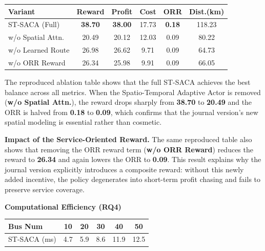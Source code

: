 \documentclass[11pt, a4paper]{article}
\begin{document}
\begin{itemize}
\begin{boxedminipage}[htbp]{\linewidth}
    \begin{center}
    \captionsetup{font=normalsize}
    \normalsize
    \setlength{\tabcolsep}{2pt}
    \begin{tabular}{@{}lccccc@{}}
    \toprule
    Variant & Reward & Profit & Cost & ORR & Dist.(km) \\
    \midrule
    ST-SACA (Full) & \textbf{38.70} & \textbf{38.00} & 17.73 & \textbf{0.18} & 118.23 \\
    w/o Spatial Attn. & 20.49 & 20.12 & 12.03 & 0.09 & 80.22 \\
    w/o Learned Route & 26.98 & 26.62 & 9.71 & 0.09 & 64.73 \\
    w/o ORR Reward & 26.34 & 25.98 & 9.91 & 0.09 & 66.05 \\
    \bottomrule
    \end{tabular}
    \end{center}

    The reproduced ablation table shows that the full ST-SACA achieves the best balance across all metrics. When the Spatio-Temporal Adaptive Actor is removed (\textbf{w/o Spatial Attn.}), the reward drops sharply from \textbf{38.70} to \textbf{20.49} and the ORR is halved from \textbf{0.18} to \textbf{0.09}, which confirms that the journal version's new spatial modeling is essential rather than cosmetic.
    
    \textbf{Impact of the Service-Oriented Reward.} The same reproduced table also shows that removing the ORR reward term (\textbf{w/o ORR Reward}) reduces the reward to \textbf{26.34} and again lowers the ORR to \textbf{0.09}. This result explains why the journal version explicitly introduces a composite reward: without this newly added incentive, the policy degenerates into short-term profit chasing and fails to preserve service coverage.

    \end{boxedminipage}

    \begin{boxedminipage}[htbp]{\linewidth}
    \vspace{2mm}
    
    \textbf{Computational Efficiency (RQ4)}

    \begin{center}
    \captionsetup{font=normalsize}
    \normalsize
    \setlength{\tabcolsep}{7pt}
    \begin{tabular}{@{}lccccc@{}}
    \toprule
    Bus Num & 10 & 20 & 30 & 40 & 50 \\
    \midrule
    ST-SACA (ms) & 4.7 & 5.9 & 8.6 & 11.9 & 12.5 \\
    \bottomrule
    \end{tabular}
    \end{center}


\end{boxedminipage}
\end{itemize}
\end{document}
